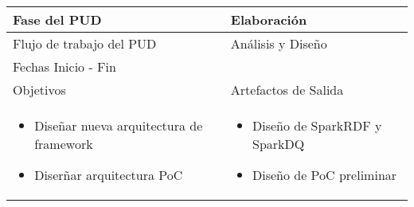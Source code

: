 
\begin{tabular}{|p{}|p{}|}

\hline

\cellcolor[gray]{0.7}Fase del \acs{PUD} & Elaboración
 \\
\hline

\cellcolor[gray]{0.7}Flujo de trabajo del \acs{PUD} & Análisis y Diseño

 \\
\hline

\cellcolor[gray]{0.7}Fechas Inicio - Fin  &
 \\
\hline

\cellcolor[gray]{0.7}Objetivos  &
\cellcolor[gray]{0.7}Artefactos de Salida \\
\hline

\begin{itemize}
\item Diseñar nueva arquitectura de framework
\item Diserñar arquitectura PoC
\end{itemize}

&

\begin{itemize}
\item Diseño de SparkRDF y SparkDQ
\item Diseño de PoC preliminar
\end{itemize}

 \\
\hline
\end{tabular}


